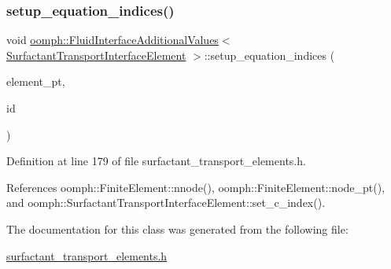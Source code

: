 \subsubsection{\texorpdfstring{setup\+\_\+equation\+\_\+indices()}{setup\_equation\_indices()}}
{\footnotesize\ttfamily void \hyperlink{classoomph_1_1FluidInterfaceAdditionalValues}{oomph\+::\+Fluid\+Interface\+Additional\+Values}$<$ \hyperlink{classoomph_1_1SurfactantTransportInterfaceElement}{Surfactant\+Transport\+Interface\+Element} $>$\+::setup\+\_\+equation\+\_\+indices (\begin{DoxyParamCaption}\item[{\hyperlink{classoomph_1_1SurfactantTransportInterfaceElement}{Surfactant\+Transport\+Interface\+Element} $\ast$const \&}]{element\+\_\+pt,  }\item[{const unsigned \&}]{id }\end{DoxyParamCaption})\hspace{0.3cm}{\ttfamily [inline]}}



Definition at line 179 of file surfactant\+\_\+transport\+\_\+elements.\+h.



References oomph\+::\+Finite\+Element\+::nnode(), oomph\+::\+Finite\+Element\+::node\+\_\+pt(), and oomph\+::\+Surfactant\+Transport\+Interface\+Element\+::set\+\_\+c\+\_\+index().



The documentation for this class was generated from the following file\+:\begin{DoxyCompactItemize}
\item 
\hyperlink{surfactant__transport__elements_8h}{surfactant\+\_\+transport\+\_\+elements.\+h}\end{DoxyCompactItemize}
